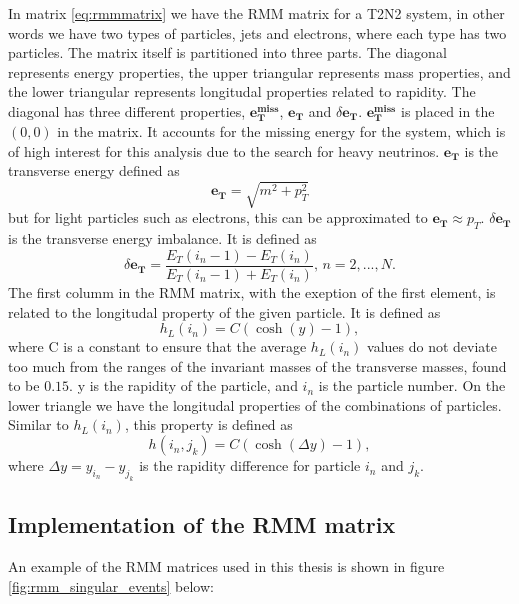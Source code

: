 In matrix \ref{eq:rmmmatrix} we have the RMM matrix for a T2N2 system, in other words we have two types of particles, jets and electrons, where each type has
two particles. The matrix itself is partitioned into three parts. The diagonal represents energy properties, the upper triangular represents mass properties, 
and the lower triangular represents longitudal properties related to rapidity. The diagonal has three different properties, $\boldsymbol{e_T^{miss}}$, $\boldsymbol{e_T}$ and $\delta\boldsymbol{e_T}$. 
$\boldsymbol{e_T^{miss}}$ is placed in the $(0,0)$ in the matrix. It accounts for the missing energy for the system, which is of high interest for this analysis due to
the search for heavy neutrinos. $\boldsymbol{e_T}$ is the transverse energy defined as 
\begin{equation*}
    \boldsymbol{e_T} = \sqrt{m^2 + p_T^2}
\end{equation*}
but for light particles such as electrons, this can be approximated to $\boldsymbol{e_T} \approx p_T$. $\delta\boldsymbol{e_T}$ is the transverse energy imbalance.
It is defined as 
\begin{equation*}
    \delta\boldsymbol{e_T} = \frac{E_T(i_n-1) - E_T(i_n)}{E_T(i_n-1) + E_T(i_n)}, \, n = 2, ..., N.
\end{equation*}
The first columm in the RMM matrix, with the exeption of the first element, is related to the longitudal property of the given particle. 
It is defined as
\begin{equation*}
    h_L(i_n) = C(\cosh{(y)} - 1),
\end{equation*}
where C is a constant to ensure that the average $h_L(i_n)$ values do not deviate too much from the ranges of the invariant masses of the transverse masses, found to be $0.15$\cite{Chekanov_2019}. 
y is the rapidity of the particle, and $i_n$ is the particle number. On the lower triangle we have the longitudal properties of the combinations of particles. Similar to $h_L(i_n)$,
this property is defined as 
\begin{equation*}
    h(i_n, j_k) = C(\cosh{(\Delta y)} - 1),
\end{equation*}
where $\Delta y = y_{i_n} - y_{j_k}$ is the rapidity difference for particle $i_n$ and $j_k$. 

\subsection*{Implementation of the RMM matrix}
An example of the RMM matrices used in this thesis is shown in figure \ref{fig:rmm_singular_events} below:


